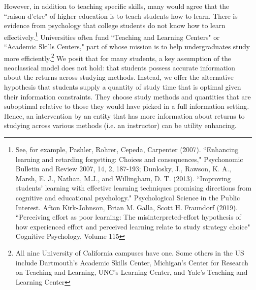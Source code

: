 \documentclass[12pt]{article}
\begin{document}
However, in addition to teaching specific skills, many would agree that the ``raison d'etre" of higher education is to teach students how to learn. There is evidence from psychology that college students do not know how to learn effectively.\footnote{See, for example, Pashler, Rohrer, Cepeda, Carpenter (2007). ``Enhancing learning and retarding forgetting: Choices and consequences," Psychonomic Bulletin and Review 2007, 14, 2, 187-193; Dunlosky, J., Rawson, K. A., Marsh, E. J., Nathan, M.J., and Willingham, D. T. (2013). ``Improving students’ learning with effective learning techniques promising directions from cognitive and educational psychology." Psychological Science in the Public Interest. Afton Kirk-Johnson, Brian M. Galla, Scott H. Fraundorf (2019). ``Perceiving effort as poor learning: The misinterpreted-effort hypothesis of how experienced effort and perceived learning relate to study strategy choice" Cognitive Psychology, Volume 115} Universities often fund ``Teaching and Learning Centers" or ``Academic Skills Centers," part of whose mission is to help undergraduates study more efficiently.\footnote{All nine University of California campuses have one. Some others in the US include Dartmouth's Academic Skills Center, Michigan's Center for Research on Teaching and Learning, UNC's Learning Center, and Yale's Teaching and Learning Center} We posit that for many students, a key assumption of the neoclassical model does not hold: that students possess accurate information about the returns across studying methods. Instead, we offer the alternative hypothesis that students supply a quantity of study time that is optimal given their information constraints. They choose study methods and quantities that are suboptimal relative to those they would have picked in a full information setting. Hence, an intervention by an entity that has more information about returns to studying across various methods (i.e. an instructor) can be utility enhancing. 
\end{document}
